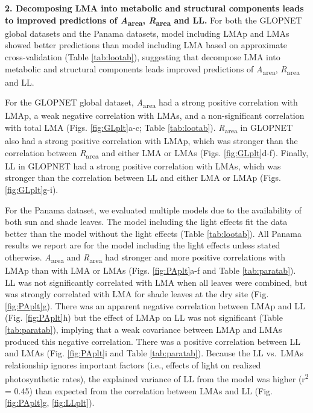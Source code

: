 \documentclass[
  12pt,
]{article}
\begin{document}
\textbf{2. Decomposing LMA into metabolic and structural components leads to improved predictions of \emph{A}\textsubscript{area}, \emph{R}\textsubscript{area} and LL.}
For both the GLOPNET global datasets and the Panama datasets, model including LMAp and LMAs showed better predictions than model including LMA based on approximate cross-validation (Table \ref{tab:lootab}), suggesting that decompose LMA into metabolic and structural components leads improved predictions of \emph{A}\textsubscript{area}, \emph{R}\textsubscript{area} and LL.

For the GLOPNET global dataset, \emph{A}\textsubscript{area} had a strong positive correlation with LMAp, a weak negative correlation with LMAs, and a non-significant correlation with total LMA (Figs. \ref{fig:GLplt}a-c; Table \ref{tab:lootab}).
\emph{R}\textsubscript{area} in GLOPNET also had a strong positive correlation with LMAp, which was stronger than the correlation between \emph{R}\textsubscript{area} and either LMA or LMAs (Figs. \ref{fig:GLplt}d-f).
Finally, LL in GLOPNET had a strong positive correlation with LMAs, which was stronger than the correlation between LL and either LMA or LMAp (Figs. \ref{fig:GLplt}g-i).

For the Panama dataset, we evaluated multiple models due to the availability of both sun and shade leaves.
The model including the light effects fit the data better than the model without the light effects (Table \ref{tab:lootab}).
All Panama results we report are for the model including the light effects unless stated otherwise.
\emph{A}\textsubscript{area} and \emph{R}\textsubscript{area} had stronger and more positive correlations with LMAp than with LMA or LMAs (Figs. \ref{fig:PAplt}a-f and Table \ref{tab:paratab}).
LL was not significantly correlated with LMA when all leaves were combined, but was strongly correlated with LMA for shade leaves at the dry site (Fig. \ref{fig:PAplt}g).
There was an apparent negative correlation between LMAp and LL (Fig. \ref{fig:PAplt}h) but the effect of LMAp on LL was not significant (Table \ref{tab:paratab}), implying that a weak covariance between LMAp and LMAs produced this negative correlation.
There was a positive correlation between LL and LMAs (Fig. \ref{fig:PAplt}i and Table \ref{tab:paratab}).
Because the LL vs.~LMAs relationship ignores important factors (i.e., effects of light on realized photosynthetic rates), the explained variance of LL from the model was higher (r\textsuperscript{2} = 0.45) than expected from the correlation between LMAs and LL (Fig. \ref{fig:PAplt}g, \ref{fig:LLplt}).
\end{document}
